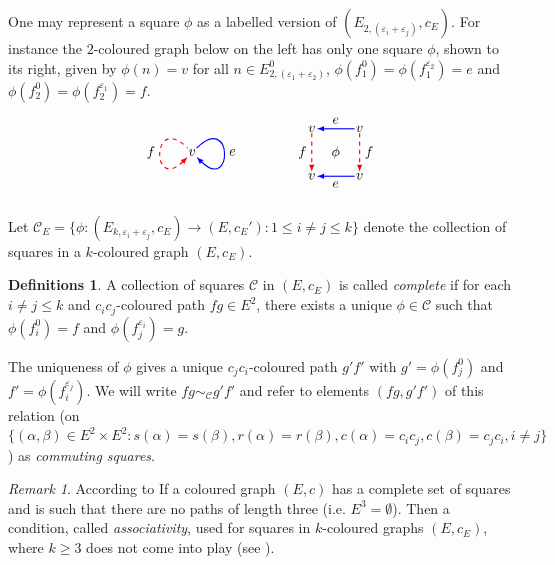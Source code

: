 \documentclass[12pt]{amsart}
\theoremstyle{definition}
\newtheorem{dfns}[thm]{Definitions}
\theoremstyle{remark}
\newtheorem{rmk}[thm]{Remark}
\numberwithin{equation}{section}
\newcommand{\Cc}{\mathcal{C}}
\begin{document}
\noindent
One may represent a square $\phi$ as a labelled version of $(E_{2,(\varepsilon_i+\varepsilon_j)},c_E)$. For instance the $2$-coloured graph below on the left has only one square $\phi$, shown to its right, given by $\phi(n) = v$ for all $n \in E_{2,{(\varepsilon_1+\varepsilon_2)}}^0$, $\phi( f_1^0) = \phi( f_1^{\varepsilon_2}) = e$ and $\phi( f_2^0 ) = \phi( f_2^{\varepsilon_1} ) = f$. %
\[
\begin{tikzpicture}[>=stealth,scale=1.2]
\node[inner sep=0.8pt] (v) at (0,0) {$v$}
	edge[loop,blue,thick,latex-,in=45,out=-45,looseness=15] node[auto,black,swap] {$e$} (v)
	edge[loop,red,thick,dashed,latex-,in=135,out=-135,looseness=15] node[auto,black] {$f$} (v);
\begin{scope}[xshift=2.5cm,yshift=-0.5cm]
\node at (0.5,0.5) {$\phi$};
\node[inner sep=0.8pt] (00) at (0,0) {$v$};
\node[inner sep=0.8pt] (10) at (1,0) {$v$}
	edge[-latex,blue,thick] node[auto,black] {$e$} (00);
\node[inner sep=0.8pt] (01) at (0,1) {$v$}
	edge[-latex,red,dashed,thick] node[auto,black,swap] {$f$} (00);
\node[inner sep=0.8pt] (11) at (1,1) {$v$}
	edge[-latex,blue,thick] node[auto,black,swap] {$e$} (01)
	edge[-latex,red,dashed,thick] node[auto,black] {$f$} (10);
\end{scope}
\end{tikzpicture}
\]

\noindent
Let $\Cc_E = \{ \phi : (E_{k,\varepsilon_i+\varepsilon_j} ,c_E)\to (E,c_E') : 1 \le i \neq j \le k  \}$ denote the collection of squares in a $k$-coloured graph $(E,c_E)$.

\begin{dfns} \label{dfn:complete-squares}
A collection of squares $\Cc$ in $(E,c_E)$ is called \emph{complete} if for each $i \neq j \leq k$ and $c_ic_j$-coloured path $fg \in E^2$, there exists a unique $\phi \in \Cc$ such that $\phi(f_i^{0}) = f$ and $\phi(f_j^{\varepsilon_i}) = g$.

The uniqueness of $\phi$ gives a unique $c_jc_i$-coloured path $g'f'$ with $g' = \phi(f_j^{0})$ and $f' = \phi(f_i^{\varepsilon_j})$. We will write $fg \sim_\Cc g'f'$ and refer to elements $(fg,g'f')$ of this relation (on $\{ (\alpha, \beta ) \in E^2 \times E^2 : s(\alpha)=s(\beta),r(\alpha)=r(\beta), c(\alpha)=c_ic_j, c(\beta)=c_jc_i , i \neq j \}$) as \emph{commuting squares}. 
\end{dfns}


\begin{rmk}
According to \cite[Theorem 4.4, Theorem 4.5]{hrsw} If a coloured graph $(E,c)$
has a complete set of squares and is such that there are no paths of length three (i.e. $E^3=\emptyset$). Then a condition, called \emph{associativity}, used for squares in $k$-coloured graphs $(E,c_E)$, where $k \ge 3$ does not come into play (see \cite[Equation (3.2)]{hrsw}).
\end{rmk}
\end{document}
